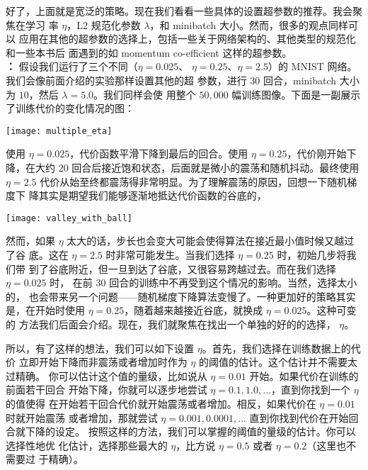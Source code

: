 好了，上面就是宽泛的策略。现在我们看看一些具体的设置超参数的推荐。我会聚焦在学习
率 $\eta$，L2 规范化参数 $\lambda$，和 minibatch 大小。然而，很多的观点同样可以
应用在其他的超参数的选择上，包括一些关于网络架构的、其他类型的规范化和一些本书后
面遇到的如 momentum co-efficient 这样的超参数。\\

\textbf{\learningrate{}：} 假设我们运行了三个不同\learningrate{}（$\eta=0.025$、
  $\eta=0.25$、$\eta=2.5$）的 MNIST 网络。我们会像前面介绍的实验那样设置其他的超
参数，进行 $30$ 回合，minibatch 大小为 $10$，然后 $\lambda = 5.0$。我们同样会使
用整个 $50,000$ 幅训练图像。下面是一副展示了训练代价的变化情况的图：
\begin{center}
  \texttt{[image: multiple\_eta]}
\end{center}

使用 $\eta=0.025$，代价函数平滑下降到最后的回合。使用 $\eta=0.25$，代价刚开始下
降，在大约 $20$ 回合后接近饱和状态，后面就是微小的震荡和随机抖动。最终使用
$\eta=2.5$ 代价从始至终都震荡得非常明显。为了理解震荡的原因，回想一下随机梯度下
降其实是期望我们能够逐渐地抵达代价函数的谷底的，
\begin{center}
  \texttt{[image: valley\_with\_ball]}
\end{center}

然而，如果 $\eta$ 太大的话，步长也会变大可能会使得算法在接近最小值时候又越过了谷
底。这在 $\eta=2.5$ 时非常可能发生。当我们选择 $\eta=0.25$ 时，初始几步将我们带
到了谷底附近，但一旦到达了谷底，又很容易跨越过去。而在我们选择 $\eta=0.025$ 时，
在前 $30$ 回合的训练中不再受到这个情况的影响。当然，选择太小的\learningrate{}，
也会带来另一个问题——随机梯度下降算法变慢了。一种更加好的策略其实是，在开始时使用
$\eta=0.25$，随着越来越接近谷底，就换成 $\eta=0.025$。这种可变\learningrate{}的
方法我们后面会介绍。现在，我们就聚焦在找出一个单独的好的\learningrate{}的选择，
$\eta$。

所以，有了这样的想法，我们可以如下设置 $\eta$。首先，我们选择在训练数据上的代价
立即开始下降而非震荡或者增加时作为 $\eta$ 的阈值的估计。这个估计并不需要太过精确。
你可以估计这个值的量级，比如说从 $\eta=0.01$ 开始。如果代价在训练的前面若干回合
开始下降，你就可以逐步地尝试 $\eta=0.1, 1.0,...$，直到你找到一个 $\eta$ 的值使得
在开始若干回合代价就开始震荡或者增加。相反，如果代价在 $\eta=0.01$ 时就开始震荡
或者增加，那就尝试 $\eta=0.001, 0.0001,...$ 直到你找到代价在开始回合就下降的设定。
按照这样的方法，我们可以掌握\learningrate{}的阈值的量级的估计。你可以选择性地优
化估计，选择那些最大的 $\eta$，比方说 $\eta=0.5$ 或者 $\eta=0.2$（这里也不需要过
  于精确）。

